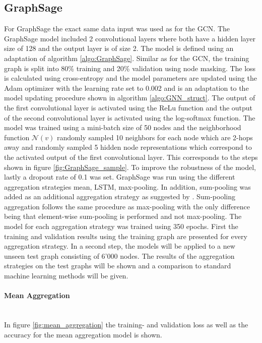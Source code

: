   \subsection{GraphSage}

  For GraphSage the exact same data input was used as for the GCN. The 
  GraphSage model included 2 convolutional layers where both have a hidden 
  layer size of 128 and the output layer is of size 2. The model is defined
  using an adaptation of algorithm \ref{algo:GraphSage}. Similar as for the 
  GCN, the training graph is split into 80\% training and 20\% validation using 
  node masking. The loss is calculated using cross-entropy and the model 
  parameters are updated using the Adam optimizer with the learning rate set to 
  0.002 and is an adaptation to the model updating procedure shown in 
  algorithm \ref{algo:GNN_struct}. The output of the first convolutional layer 
  is activated using the ReLu function and the output of the second 
  convolutional layer is activated using the log-softmax function. The model was 
  trained using a mini-batch size of 50 nodes and the neighborhood function 
  $\mathcal{N}(v)$ randomly sampled 10 neighbors for each node which are 2-hops 
  away and randomly sampled 5 hidden node representations which correspond to 
  the activated output of the first convolutional layer. This corresponds to 
  the steps shown in figure \ref{fig:GraphSage_sample}. To improve the 
  robustness of the model, lastly a dropout rate of 0.1 was set. GraphSage was 
  run using the different aggregation strategies mean, LSTM, max-pooling. In
  addition, sum-pooling was added as an additional aggregation strategy as
  suggested by \cite{xu2018powerful}. Sum-pooling aggregation follows the same
  procedure as max-pooling with the only difference being that element-wise
  sum-pooling is performed and not max-pooling. The model for each aggregation 
  strategy was trained using 350 epochs. First the training and validation
  results using the training graph are presented for every aggregation
  strategy. In a second step, the models will be applied to a new unseen test 
  graph consisting of 6'000 nodes. The results of the aggregation strategies on
  the test graphs will be shown and a comparison to standard machine learning
  methods will be given. 

  \paragraph{Mean Aggregation}  \mbox{}\\ 
  In figure \ref{fig:mean_aggregation} the training- and validation loss as
  well as the accuracy for the mean aggregation model is shown.

